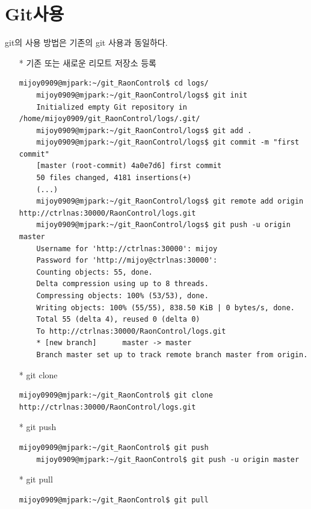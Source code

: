 \documentclass[11pt
  , a4paper
  , article
  , oneside
]{memoir}
\begin{document}
\clearpage
\chapter{Git사용}
git의 사용 방법은 기존의 git 사용과 동일하다.

\begin{itemize}
\item[*] 기존 또는 새로운 리모트 저장소 등록
{\scriptsize
\begin{lstlisting}[style=termstyle, escapechar=!]
	mijoy0909@mjpark:~/git_RaonControl$ cd logs/
	mijoy0909@mjpark:~/git_RaonControl/logs$ git init
	Initialized empty Git repository in /home/mijoy0909/git_RaonControl/logs/.git/
	mijoy0909@mjpark:~/git_RaonControl/logs$ git add .
	mijoy0909@mjpark:~/git_RaonControl/logs$ git commit -m "first commit"
	[master (root-commit) 4a0e7d6] first commit
	50 files changed, 4181 insertions(+)
	(...)
	mijoy0909@mjpark:~/git_RaonControl/logs$ git remote add origin http://ctrlnas:30000/RaonControl/logs.git
	mijoy0909@mjpark:~/git_RaonControl/logs$ git push -u origin master 
	Username for 'http://ctrlnas:30000': mijoy
	Password for 'http://mijoy@ctrlnas:30000': 
	Counting objects: 55, done.
	Delta compression using up to 8 threads.
	Compressing objects: 100% (53/53), done.
	Writing objects: 100% (55/55), 838.50 KiB | 0 bytes/s, done.
	Total 55 (delta 4), reused 0 (delta 0)
	To http://ctrlnas:30000/RaonControl/logs.git
	* [new branch]      master -> master
	Branch master set up to track remote branch master from origin. 
\end{lstlisting}

}

\item[*] git clone
{\scriptsize
\begin{lstlisting}[style=termstyle, escapechar=!]
	mijoy0909@mjpark:~/git_RaonControl$ git clone http://ctrlnas:30000/RaonControl/logs.git
\end{lstlisting}
}
	
\item[*] git push
{\scriptsize
\begin{lstlisting}[style=termstyle, escapechar=!]
	mijoy0909@mjpark:~/git_RaonControl$ git push  
	mijoy0909@mjpark:~/git_RaonControl$ git push -u origin master 
\end{lstlisting}
}

\item[*] git  pull
{\scriptsize
\begin{lstlisting}[style=termstyle, escapechar=!]
	mijoy0909@mjpark:~/git_RaonControl$ git pull
\end{lstlisting}
}
\end{itemize}
\end{document}
